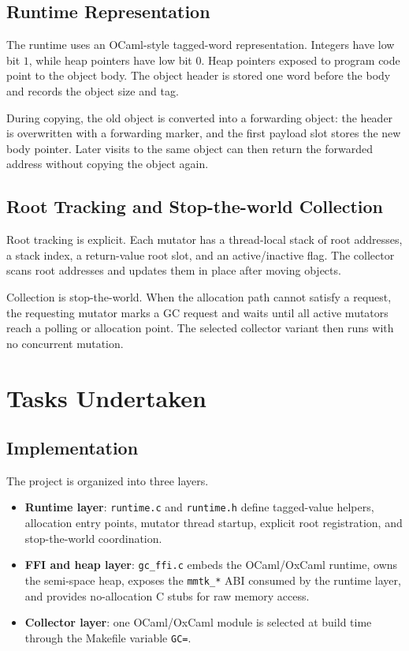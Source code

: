 \documentclass[11pt,a4paper]{article}
\begin{document}
\subsection{Runtime Representation}

The runtime uses an OCaml-style tagged-word representation. Integers have low
bit \(1\), while heap pointers have low bit \(0\). Heap pointers exposed to
program code point to the object body. The object header is stored one word
before the body and records the object size and tag.

During copying, the old object is converted into a forwarding object: the header
is overwritten with a forwarding marker, and the first payload slot stores the
new body pointer. Later visits to the same object can then return the forwarded
address without copying the object again.

\subsection{Root Tracking and Stop-the-world Collection}

Root tracking is explicit. Each mutator has a thread-local stack of root
addresses, a stack index, a return-value root slot, and an active/inactive flag.
The collector scans root addresses and updates them in place after moving
objects.

Collection is stop-the-world. When the allocation path cannot satisfy a request,
the requesting mutator marks a GC request and waits until all active mutators
reach a polling or allocation point. The selected collector variant then runs
with no concurrent mutation.

\section{Tasks Undertaken}
\label{sec:tasks}

\subsection{Implementation}

The project is organized into three layers.

\begin{itemize}[leftmargin=*]
  \item \textbf{Runtime layer}: \texttt{runtime.c} and \texttt{runtime.h}
  define tagged-value helpers, allocation entry points, mutator thread startup,
  explicit root registration, and stop-the-world coordination.
  \item \textbf{FFI and heap layer}: \texttt{gc\_ffi.c} embeds the OCaml/OxCaml
  runtime, owns the semi-space heap, exposes the \texttt{mmtk\_*} ABI consumed
  by the runtime layer, and provides no-allocation C stubs for raw memory
  access.
  \item \textbf{Collector layer}: one OCaml/OxCaml module is selected at build
  time through the Makefile variable \texttt{GC=}.
\end{itemize}
\end{document}
